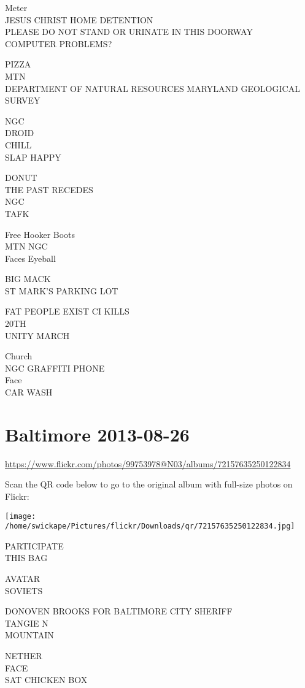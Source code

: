 \documentclass[10pt,letterpaper]{article}
\begin{document}
Meter\\
JESUS CHRIST HOME DETENTION\\
PLEASE DO NOT STAND OR URINATE IN THIS DOORWAY\\
COMPUTER PROBLEMS?

PIZZA\\
MTN\\
DEPARTMENT OF NATURAL RESOURCES MARYLAND GEOLOGICAL SURVEY

NGC\\
DROID\\
CHILL\\
SLAP HAPPY

DONUT\\
THE PAST RECEDES\\
NGC\\
TAFK

Free Hooker Boots\\
MTN NGC\\
Faces Eyeball

BIG MACK\\
ST MARK'S PARKING LOT

FAT PEOPLE EXIST CI KILLS\\
20TH\\
UNITY MARCH

Church\\
NGC GRAFFITI PHONE\\
Face\\
CAR WASH


\section*{Baltimore 2013-08-26}

\url{https://www.flickr.com/photos/99753978@N03/albums/72157635250122834}

Scan the QR code below to go to the original album with full-size photos on Flickr:

\texttt{[image: /home/swickape/Pictures/flickr/Downloads/qr/72157635250122834.jpg]}


PARTICIPATE\\
THIS BAG

AVATAR\\
SOVIETS

DONOVEN BROOKS FOR BALTIMORE CITY SHERIFF\\
TANGIE N\\
MOUNTAIN

NETHER\\
FACE\\
SAT CHICKEN BOX
\end{document}
